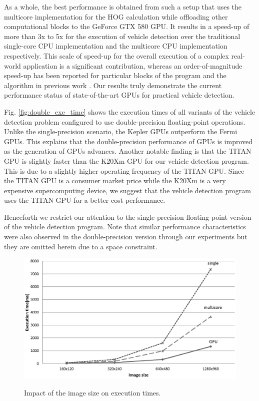 As a whole, the best performance is obtained from such a setup that
uses the multicore implementation for the HOG calculation while
offloading other computational blocks to the GeForce GTX 580 GPU.
It results in a speed-up of more than 3x to 5x for the execution of
vehicle detection over the traditional single-core CPU implementation
and the multicore CPU implementation respectively.
This scale of speed-up for the overall execution of a complex real-world
application is a significant contribution, whereas an order-of-magnitude
speed-up has been reported for particular blocks of the program and the
algorithm in previous work \cite{Chen11, Prisacariu09}.
Our results truly demonstrate the current performance status of
state-of-the-art GPUs for practical vehicle detection.

Fig. \ref{fig:double_exe_time} shows the execution times of all variants
of the vehicle detection problem configured to use double-precision
floating-point operations.
Unlike the single-precision scenario, the Kepler GPUs outperform the
Fermi GPUs.
This explains that the double-precision performance of GPUs is improved
as the generation of GPUs advances.
Another notable finding is that the TITAN GPU is slightly faster than
the K20Xm GPU for our vehicle detection program.
This is due to a slightly higher operating frequency of the TITAN GPU.
Since the TITAN GPU is a consumer market price while the K20Xm is a very
expensive supercomputing device, we suggest that the vehicle detection
program uses the TITAN GPU for a better cost performance.

Henceforth we restrict our attention to the single-precision
floating-point version of the vehicle detection program.
Note that similar performance characteristics were also observed in the
double-precision version through our experiments but they are omitted
herein due to a space constraint.

\begin{figure}[t]
 \begin{center}
  \includegraphics[width=\hsize]{fig/time_on_image_size.eps}\\
  \caption{Impact of the image size on execution times.}
  \label{fig:time_on_image_size}
 \end{center}
\end{figure}


